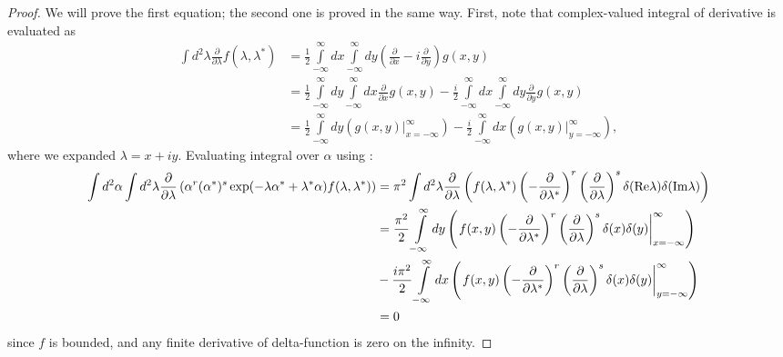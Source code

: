 \begin{proof}
We will prove the first equation; the second one is proved in the same way.
First, note that complex-valued integral of derivative is evaluated as
\begin{equation*}
\begin{split}
	\int d^2\lambda \frac{\partial}{\partial \lambda} f(\lambda, \lambda^*)
	& = \frac{1}{2} \int\limits_{-\infty}^{\infty} dx \int\limits_{-\infty}^{\infty} dy
		\left( \frac{\partial}{\partial x} - i \frac{\partial}{\partial y} \right)
		g(x, y) \\
	& = \frac{1}{2} \int\limits_{-\infty}^{\infty} dy \int\limits_{-\infty}^{\infty} dx
			\frac{\partial}{\partial x} g(x, y)
		- \frac{i}{2} \int\limits_{-\infty}^{\infty} dx \int\limits_{-\infty}^{\infty} dy
			\frac{\partial}{\partial y} g(x, y) \\
	& =	\frac{1}{2} \int\limits_{-\infty}^{\infty} dy \left(
			\left. g(x, y) \right|_{x=-\infty}^{\infty}
		\right)
		- \frac{i}{2} \int\limits_{-\infty}^{\infty} dx \left(
			\left. g(x, y) \right|_{y=-\infty}^{\infty}
		\right),
\end{split}
\end{equation*}
where we expanded $\lambda = x + iy$.
Evaluating integral over $\alpha$ using :
\begin{equation*}
\begin{split}
	\int d^2\alpha \int d^2\lambda
		\frac{\partial}{\partial \lambda} \left(
			\alpha^r (\alpha^*)^s \exp(-\lambda \alpha^* + \lambda^* \alpha) f(\lambda, \lambda^*)
		\right)
	& = \pi^2 \int d^2\lambda
		\frac{\partial}{\partial \lambda} \left(
			f(\lambda, \lambda^*)
			\left( -\frac{\partial}{\partial \lambda^*} \right)^r
			\left( \frac{\partial}{\partial \lambda} \right)^s
			\delta(\mathrm{Re} \lambda) \delta(\mathrm{Im} \lambda)
		\right) \\
	& = \frac{\pi^2}{2} \int\limits_{-\infty}^{\infty} dy \left(
		\left.
			f(x, y)
			\left( -\frac{\partial}{\partial \lambda^*} \right)^r
			\left( \frac{\partial}{\partial \lambda} \right)^s
			\delta(x) \delta(y)
		\right|_{x=-\infty}^{\infty}
	\right) \\
	& - \frac{i\pi^2}{2} \int\limits_{-\infty}^{\infty} dx \left(
		\left.
			f(x, y)
			\left( -\frac{\partial}{\partial \lambda^*} \right)^r
			\left( \frac{\partial}{\partial \lambda} \right)^s
			\delta(x) \delta(y)
		\right|_{y=-\infty}^{\infty}
	\right) \\
	& = 0
\end{split}
\end{equation*}
since $f$ is bounded,
and any finite derivative of delta-function is zero on the infinity.
\end{proof}

